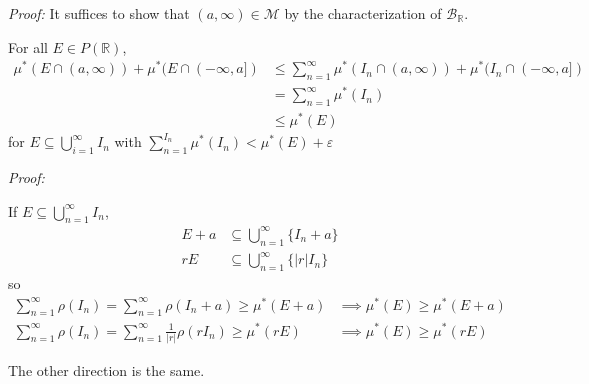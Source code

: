 \documentclass[12pt]{article}
\newcommand{\R}{\mathbb{R}}
\newcommand{\abs}[1]{\left\vert #1 \right\vert}
\newcommand{\ep}{\varepsilon}
\newcommand{\B}{\mathcal{B}}
\newcommand{\M}{\mathcal{M}}
\newcommand{\sub}{\subseteq}
\newenvironment*{tbox}[2][gray]{
    \begin{tcolorbox}[
        parbox=false,
        colback=#1!5!white,
        colframe=#1!75!black,
        breakable,
        title={#2}
    ]}
    {\end{tcolorbox}}
\begin{document}
    \begin{tbox}{\textbf{Proposition:} $\B_{\R} \sub \M$}
        \emph{Proof:} It suffices to show that $(a, \infty) \in \M$ by the characterization of $\B_{\R}$. 

        For all $E \in P(\R)$,
        \begin{align*}
            \mu^*(E \cap (a, \infty)) + \mu^*(E \cap (-\infty, a]) &\leq \sum_{n=1}^{\infty } \mu^*(I_n \cap (a, \infty)) + \mu^*(I_n \cap (-\infty, a])\\ 
            &= \sum_{n=1}^{\infty} \mu^*(I_n)\\ 
            &\leq \mu^*(E)
        \end{align*} 
        for $E \sub \bigcup_{i=1}^\infty I_n$ with $\sum_{n=1}^{I_n} \mu^*(I_n) < \mu^*(E) + \ep$ 
    \end{tbox}

    \begin{tbox}{\textbf{Lemma:} for the Lebesgue outer measure, 
        \begin{enumerate}
            \item $\mu^*(E + a) = \mu^*(E)$
            \item $\mu^*(rE) = \abs{r} \mu^*(E)$
        \end{enumerate} }
        \emph{Proof:} 

        If $E \sub \bigcup_{n=1}^\infty I_n$, 
        \begin{align*}
            E + a &\sub \bigcup_{n=1}^\infty \{I_n + a\}\\ 
            rE &\sub \bigcup_{n=1}^\infty \{\abs{r}I_n\}
        \end{align*}
        so 
       \begin{align*}
         \sum_{n=1}^{\infty} \rho(I_n) = \sum_{n=1}^\infty \rho(I_n + a) \geq \mu^*(E + a) &\implies \mu^*(E) \geq \mu^*(E + a)\\ 
         \sum_{n=1}^{\infty} \rho(I_n) = \sum_{n=1}^\infty \frac{1}{\abs{r}}\rho(rI_n) \geq \mu^*(rE) &\implies \mu^*(E) \geq \mu^*(rE)
       \end{align*}

       The other direction is the same. 
    \end{tbox}
\end{document}
